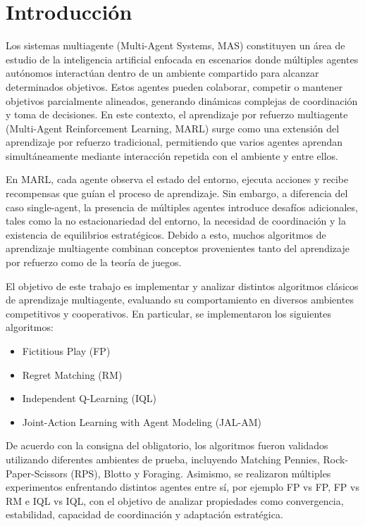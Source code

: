 \documentclass[letterpaper,12pt]{article} %
\begin{document}
    
    \newpage
    \tableofcontents
    \newpage


\section{Introducción}

Los sistemas multiagente (Multi-Agent Systems, MAS) constituyen un área de estudio de la inteligencia artificial enfocada en escenarios donde múltiples agentes autónomos interactúan dentro de un ambiente compartido para alcanzar determinados objetivos. Estos agentes pueden colaborar, competir o mantener objetivos parcialmente alineados, generando dinámicas complejas de coordinación y toma de decisiones. En este contexto, el aprendizaje por refuerzo multiagente (Multi-Agent Reinforcement Learning, MARL) surge como una extensión del aprendizaje por refuerzo tradicional, permitiendo que varios agentes aprendan simultáneamente mediante interacción repetida con el ambiente y entre ellos.

En MARL, cada agente observa el estado del entorno, ejecuta acciones y recibe recompensas que guían el proceso de aprendizaje. Sin embargo, a diferencia del caso single-agent, la presencia de múltiples agentes introduce desafíos adicionales, tales como la no estacionariedad del entorno, la necesidad de coordinación y la existencia de equilibrios estratégicos. Debido a esto, muchos algoritmos de aprendizaje multiagente combinan conceptos provenientes tanto del aprendizaje por refuerzo como de la teoría de juegos.

El objetivo de este trabajo es implementar y analizar distintos algoritmos clásicos de aprendizaje multiagente, evaluando su comportamiento en diversos ambientes competitivos y cooperativos. En particular, se implementaron los siguientes algoritmos:

\begin{itemize}
    \item Fictitious Play (FP)
    \item Regret Matching (RM)
    \item Independent Q-Learning (IQL)
    \item Joint-Action Learning with Agent Modeling (JAL-AM)
\end{itemize}

De acuerdo con la consigna del obligatorio, los algoritmos fueron validados utilizando diferentes ambientes de prueba, incluyendo Matching Pennies, Rock-Paper-Scissors (RPS), Blotto y Foraging. Asimismo, se realizaron múltiples experimentos enfrentando distintos agentes entre sí, por ejemplo FP vs FP, FP vs RM e IQL vs IQL, con el objetivo de analizar propiedades como convergencia, estabilidad, capacidad de coordinación y adaptación estratégica.
\end{document}
